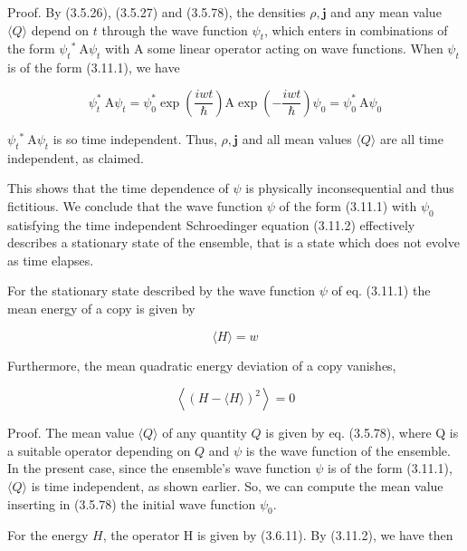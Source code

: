\documentclass{article}
\begin{document}
Proof. By (3.5.26), (3.5.27) and (3.5.78), the densities $\rho, \boldsymbol{j}$ and any mean value $\langle Q\rangle$ depend on $t$ through the wave function $\psi_{t}$, which enters in combinations of the form $\psi_{t}{ }^{*} \mathrm{~A} \psi_{t}$ with A some linear operator acting on wave functions. When $\psi_{t}$ is of the form (3.11.1), we have
 
\begin{equation*}
\psi_{t}^{*} \mathrm{~A} \psi_{t}=\psi_{0}^{*} \exp \left(\frac{i w t}{\hbar}\right) \mathrm{A} \exp \left(-\frac{i w t}{\hbar}\right) \psi_{0}=\psi_{0}^{*} \mathrm{~A} \psi_{0} \tag{3.11.4}
\end{equation*}
 
$\psi_{t}{ }^{*} \mathrm{~A} \psi_{t}$ is so time independent. Thus, $\rho, \boldsymbol{j}$ and all mean values $\langle Q\rangle$ are all time independent, as claimed.

This shows that the time dependence of $\psi$ is physically inconsequential and thus fictitious. We conclude that
the wave function $\psi$ of the form (3.11.1) with $\psi_{0}$ satisfying the time independent Schroedinger equation (3.11.2) effectively describes a stationary state of the ensemble, that is a state which does not evolve as time elapses.

For the stationary state described by the wave function $\psi$ of eq. (3.11.1) the mean energy of a copy is given by
 
\begin{equation*}
\langle H\rangle=w \tag{3.11.5}
\end{equation*}
 

Furthermore, the mean quadratic energy deviation of a copy vanishes,
 
\begin{equation*}
\left\langle(H-\langle H\rangle)^{2}\right\rangle=0 \tag{3.11.6}
\end{equation*}
 

Proof. The mean value $\langle Q\rangle$ of any quantity $Q$ is given by eq. (3.5.78), where Q is a suitable operator depending on $Q$ and $\psi$ is the wave function of the ensemble. In the present case, since the ensemble's wave function $\psi$ is of the form (3.11.1), $\langle Q\rangle$ is time independent, as shown earlier. So, we can compute the mean value inserting in (3.5.78) the initial wave function $\psi_{0}$.

For the energy $H$, the operator H is given by (3.6.11). By (3.11.2), we have then
 
\end{document}
